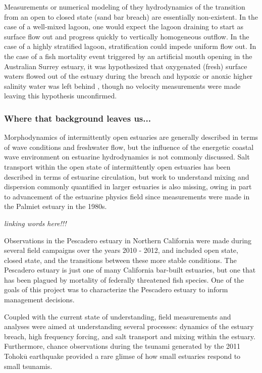 Measurements or numerical modeling of they hydrodynamics of the transition from an open to closed state (sand bar breach) are essentially non-existent. In the case of a well-mixed lagoon, one would expect the lagoon draining to start as surface flow out and progress quickly to vertically homogeneous outflow.  In the case of a highly stratified lagoon, stratification could impede uniform flow out. In the case of a fish mortality event triggered by an artificial mouth opening in the Australian Surrey estuary, it was hypothesized that oxygenated (fresh) surface waters flowed out of the estuary during the breach and hypoxic or anoxic higher salinity water was left behind \parencite{becker_artificial_2009}, though no velocity measurements were made leaving this hypothesis unconfirmed.

\subsubsection{Where that background leaves us...} 
Morphodynamics of intermittently open estuaries are generally described in terms of wave conditions and freshwater flow, but the influence of the energetic coastal wave environment on estuarine hydrodynamics is not commonly discussed. Salt transport within the open state of intermittently open estuaries has been described in terms of estuarine circulation, but work to understand mixing and dispersion commonly quantified in larger estuaries is also missing, owing in part to advancement of the estuarine physics field since measurements were made in the Palmiet estuary in the 1980s. 

\emph{linking words here!!!}

Observations in the Pescadero estuary in Northern California were made during several field campaigns over the years 2010 - 2012, and included open state, closed state, and the transitions between these more stable conditions. The Pescadero estuary is just one of many California bar-built estuaries, but one that has been plagued by mortality of federally threatened fish species. One of the goals of this project was to characterize the Pescadero estuary to inform management decisions. 

Coupled with the current state of understanding, field measurements and analyses were aimed at understanding several processes: dynamics of the estuary breach, high frequency forcing, and salt transport and mixing within the estuary. Furthermore, chance observations during the tsunami generated by the 2011 Tohok$\overline{\mathrm{u}}$ earthquake provided a rare glimse of how small estuaries respond to small tsunamis. 


